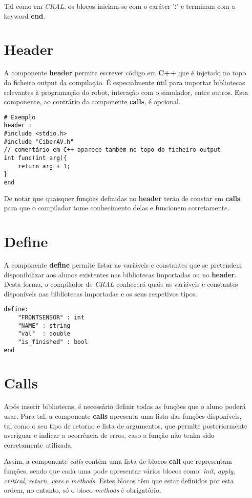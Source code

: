 \documentclass{report}
\begin{document}
Tal como em \textit{CRAL}, os blocos iniciam-se com o caráter '\textbf{:}' e terminam com a keyword \textbf{end}.

\section{Header}
A componente \textbf{header} permite escrever código em \textbf{C++} que é injetado no topo do ficheiro output da compilação.
É especialmente útil para importar bibliotecas relevantes à programação do robot, interação com o simulador, entre outros.
Esta componente, ao contrário da componente \textbf{calls}, é opcional.

\begin{verbatim}
# Exemplo
header :
#include <stdio.h>
#include "CiberAV.h"
// comentário em C++ aparece também no topo do ficheiro output
int func(int arg){
    return arg + 1;
}
end
\end{verbatim}

De notar que quaisquer funções definidas no \textbf{header} terão de constar em \textbf{calls} para que o compilador tome conhecimento delas e funcionem corretamente.

\section{Define}
A componente \textbf{define} permite listar as variáveis e constantes que se pretendem disponibilizar aos alunos existentes nas bibliotecas importadas ou no \textbf{header}. Desta forma, o compilador de \textit{CRAL} conhecerá quais as variáveis e constantes disponíveis nas bibliotecas importadas e os seus respetivos tipos.

\begin{verbatim}
define:
    "FRONTSENSOR" : int
    "NAME" : string
    "val"  : double
    "is_finished" : bool
end
\end{verbatim}


\section{Calls}
Após inserir bibliotecas, é necessário definir todas as funções que o aluno poderá usar. Para tal, a componente \textbf{calls} apresenta uma lista das funções disponíveis, tal como o seu tipo de retorno e lista de argumentos, que permite posteriormente averiguar e indicar a ocorrência de erros, caso a função não tenha sido corretamente utilizada.

 Assim, a componente \textit{calls} contém uma lista de blocos \textbf{call} que representam funções, sendo que cada uma pode apresentar vários blocos como: \textit{init}, \textit{apply}, \textit{critical}, \textit{return}, \textit{vars} e \textit{methods}. Estes blocos têm que estar definidos por esta ordem, no entanto, só o bloco \textit{methods} é obrigatório.
\end{document}
